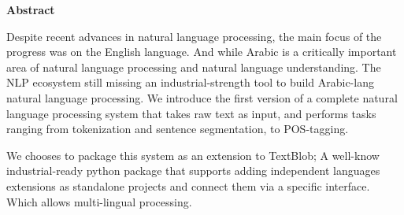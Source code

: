 \thispagestyle{plain}
\begin{center}
    \vspace{0.9cm}
    \large
    \textbf{Abstract}
\end{center}

Despite recent advances in natural language processing, the main focus of the progress was on the English language. And while Arabic is a critically important area of natural language processing and natural language understanding. The NLP ecosystem still missing an industrial-strength tool to build Arabic-lang natural language processing. We introduce the first version of a complete natural language processing system that takes raw text as input, and performs tasks ranging from tokenization and sentence segmentation, to POS-tagging.

We chooses to package this system as an extension to TextBlob; A well-know industrial-ready python package that supports adding independent languages extensions as standalone projects and connect  them via a specific interface. Which allows multi-lingual processing.